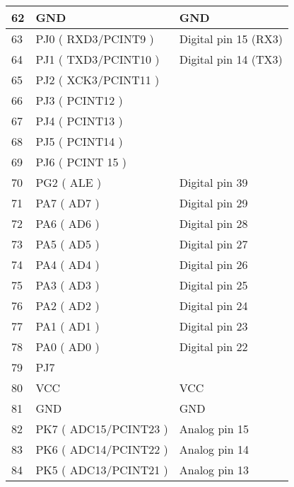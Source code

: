 \begin{longtable}[c]{|l|l|l|}
    62         & GND                      & GND                   \\ \hline
    63         & PJ0 ( RXD3/PCINT9 )      & Digital pin 15 (RX3)  \\ \hline
    64         & PJ1 ( TXD3/PCINT10 )     & Digital pin 14 (TX3)  \\ \hline
    65         & PJ2 ( XCK3/PCINT11 )     &                       \\ \hline
    66         & PJ3 ( PCINT12 )          &                       \\ \hline
    67         & PJ4 ( PCINT13 )          &                       \\ \hline
    68         & PJ5 ( PCINT14 )          &                       \\ \hline
    69         & PJ6 ( PCINT 15 )         &                       \\ \hline
    70         & PG2 ( ALE )              & Digital pin 39        \\ \hline
    71         & PA7 ( AD7 )              & Digital pin 29        \\ \hline
    72         & PA6 ( AD6 )              & Digital pin 28        \\ \hline
    73         & PA5 ( AD5 )              & Digital pin 27        \\ \hline
    74         & PA4 ( AD4 )              & Digital pin 26        \\ \hline
    75         & PA3 ( AD3 )              & Digital pin 25        \\ \hline
    76         & PA2 ( AD2 )              & Digital pin 24        \\ \hline
    77         & PA1 ( AD1 )              & Digital pin 23        \\ \hline
    78         & PA0 ( AD0 )              & Digital pin 22        \\ \hline
    79         & PJ7                      &                       \\ \hline
    80         & VCC                      & VCC                   \\ \hline
    81         & GND                      & GND                   \\ \hline
    82         & PK7 ( ADC15/PCINT23 )    & Analog pin 15         \\ \hline
    83         & PK6 ( ADC14/PCINT22 )    & Analog pin 14         \\ \hline
    84         & PK5 ( ADC13/PCINT21 )    & Analog pin 13         \\ \hline

\end{longtable}
